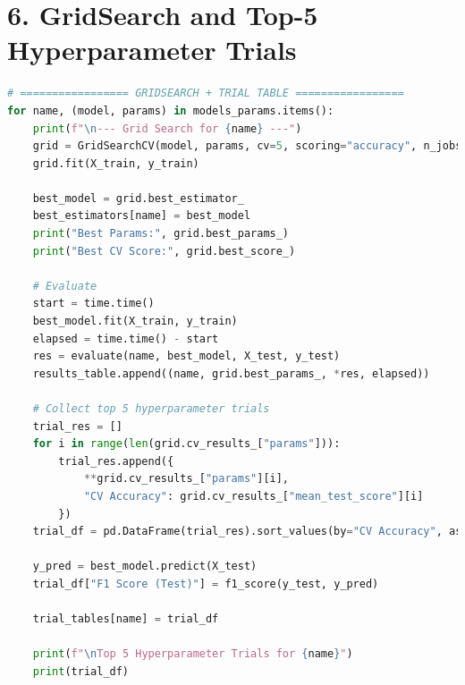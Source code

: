 \documentclass[12pt]{article}
\begin{document}
\section*{6. GridSearch and Top-5 Hyperparameter Trials}
\begin{lstlisting}[language=Python]
# ================= GRIDSEARCH + TRIAL TABLE =================
for name, (model, params) in models_params.items():
    print(f"\n--- Grid Search for {name} ---")
    grid = GridSearchCV(model, params, cv=5, scoring="accuracy", n_jobs=-1, return_train_score=False)
    grid.fit(X_train, y_train)

    best_model = grid.best_estimator_
    best_estimators[name] = best_model
    print("Best Params:", grid.best_params_)
    print("Best CV Score:", grid.best_score_)

    # Evaluate
    start = time.time()
    best_model.fit(X_train, y_train)
    elapsed = time.time() - start
    res = evaluate(name, best_model, X_test, y_test)
    results_table.append((name, grid.best_params_, *res, elapsed))

    # Collect top 5 hyperparameter trials
    trial_res = []
    for i in range(len(grid.cv_results_["params"])):
        trial_res.append({
            **grid.cv_results_["params"][i],
            "CV Accuracy": grid.cv_results_["mean_test_score"][i]
        })
    trial_df = pd.DataFrame(trial_res).sort_values(by="CV Accuracy", ascending=False).head(5)

    y_pred = best_model.predict(X_test)
    trial_df["F1 Score (Test)"] = f1_score(y_test, y_pred)

    trial_tables[name] = trial_df

    print(f"\nTop 5 Hyperparameter Trials for {name}")
    print(trial_df)
\end{lstlisting}
\end{document}
